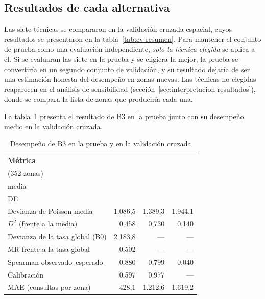 \subsection{Resultados de cada alternativa}
\label{sec:resultados-modelo}

Las siete técnicas se compararon en la validación cruzada espacial, cuyos resultados se
presentaron en la tabla~\ref{tab:cv-resumen}. Para mantener el conjunto de prueba como una
evaluación independiente, \emph{solo la técnica elegida} se aplica a él. Si se evaluaran
las siete en la prueba y se eligiera la mejor, la prueba se convertiría en un segundo
conjunto de validación, y su resultado dejaría de ser una estimación honesta del desempeño
en zonas nuevas. Las técnicas no elegidas reaparecen en el análisis de sensibilidad
(sección~\ref{sec:interpretacion-resultados}), donde se compara la lista de zonas que
produciría cada una.

La tabla~\ref{tab:metricas-prueba} presenta el resultado de B3 en la prueba junto con su
desempeño medio en la validación cruzada.

\begin{table}[H]
  \centering
  \caption{Desempeño de B3 en la prueba y en la validación cruzada}
  \label{tab:metricas-prueba}
  \interlineadoSimple
  \small
  \begin{tabular}{@{}lrrr@{}}
    \toprule
    \textbf{Métrica} & \textbf{\celda{Prueba\\(352 zonas)}} & \textbf{\celda{Validación\\media}} & \textbf{\celda{Validación\\DE}} \\
    \midrule
    Devianza de Poisson media & 1.086,5 & 1.389,3 & 1.944,1 \\
    $D^2$ (frente a la media) & 0,458 & 0,730 & 0,140 \\
    Devianza de la tasa global (B0) & 2.183,8 & --- & --- \\
    MR frente a la tasa global & 0,502 & --- & --- \\
    Spearman observado--esperado & 0,880 & 0,799 & 0,040 \\
    Calibración & 0,597 & 0,977 & --- \\
    MAE (consultas por zona) & 428,1 & 1.212,6 & 1.619,2 \\
    \bottomrule
  \end{tabular}
\end{table}

